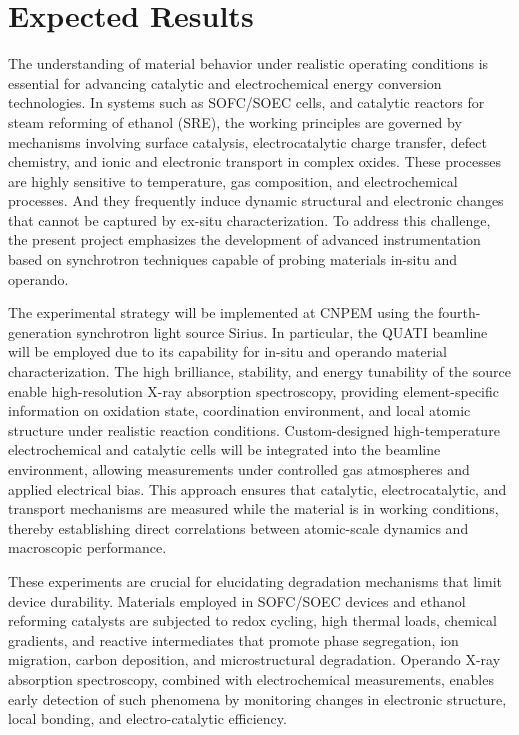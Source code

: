 \section{Expected Results}

The understanding of material behavior under realistic operating conditions is essential for advancing catalytic and electrochemical energy conversion technologies. In systems such as SOFC/SOEC cells, and catalytic reactors for steam reforming of ethanol (SRE), the working principles are governed by mechanisms involving surface catalysis, electrocatalytic charge transfer, defect chemistry, and ionic and electronic transport in complex oxides. These processes are highly sensitive to temperature, gas composition, and electrochemical processes. And they frequently induce dynamic structural and electronic changes that cannot be captured by ex-situ characterization. To address this challenge, the present project emphasizes the development of advanced instrumentation based on synchrotron techniques capable of probing materials in-situ and operando.

The experimental strategy will be implemented at CNPEM using the fourth-generation synchrotron light source Sirius. In particular, the QUATI beamline will be employed due to its capability for in-situ and operando material characterization. The high brilliance, stability, and energy tunability of the source enable high-resolution X-ray absorption spectroscopy, providing element-specific information on oxidation state, coordination environment, and local atomic structure under realistic reaction conditions. Custom-designed high-temperature electrochemical and catalytic cells will be integrated into the beamline environment, allowing measurements under controlled gas atmospheres and applied electrical bias. This approach ensures that catalytic, electrocatalytic, and transport mechanisms are measured while the material is in working conditions, thereby establishing direct correlations between atomic-scale dynamics and macroscopic performance.

These experiments are crucial for elucidating degradation mechanisms that limit device durability. Materials employed in SOFC/SOEC devices and ethanol reforming catalysts are subjected to redox cycling, high thermal loads, chemical gradients, and reactive intermediates that promote phase segregation, ion migration, carbon deposition, and microstructural degradation. Operando X-ray absorption spectroscopy, combined with electrochemical measurements, enables early detection of such phenomena by monitoring changes in electronic structure, local bonding, and electro-catalytic efficiency. 

